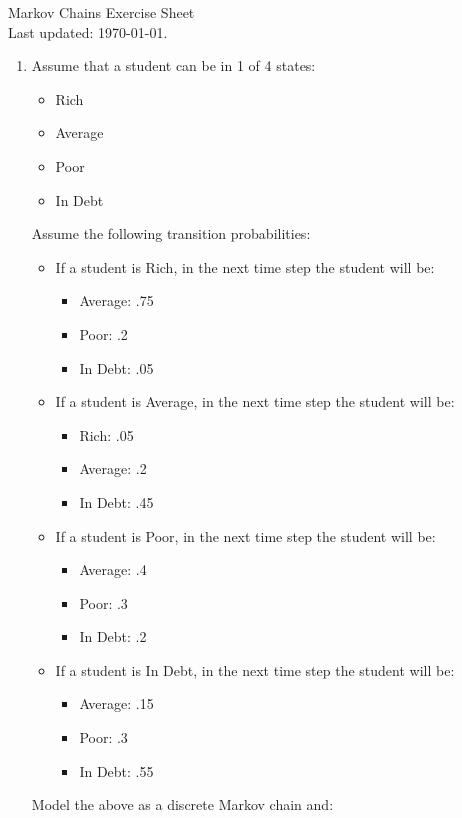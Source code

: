 \documentclass[12pt]{article}
\begin{document}
\begin{center}
\Huge{Markov Chains Exercise Sheet}\\
\tiny{Last updated: \today.}
\end{center}

\begin{enumerate}
\item Assume that a student can be in 1 of 4 states:
\begin{itemize}
	\item Rich
	\item Average
	\item Poor
	\item In Debt
\end{itemize}
Assume the following transition probabilities:

\begin{itemize}
	\item If a student is Rich, in the next time step the student will be:
	\begin{itemize}
		\item Average: .75
		\item Poor: .2
		\item In Debt: .05
	\end{itemize}
	\item If a student is Average, in the next time step the student will be:
	\begin{itemize}
		\item Rich: .05
		\item Average: .2
		\item In Debt: .45
	\end{itemize}
	\item If a student is Poor, in the next time step the student will be:
	\begin{itemize}
		\item Average: .4
		\item Poor: .3
		\item In Debt: .2
	\end{itemize}
	\item If a student is In Debt, in the next time step the student will be:
	\begin{itemize}
		\item Average: .15
		\item Poor: .3
		\item In Debt: .55
	\end{itemize}
\end{itemize}Model the above as a discrete Markov chain and:
\begin{enumerate}

\end{enumerate}
\end{enumerate}
\end{document}
